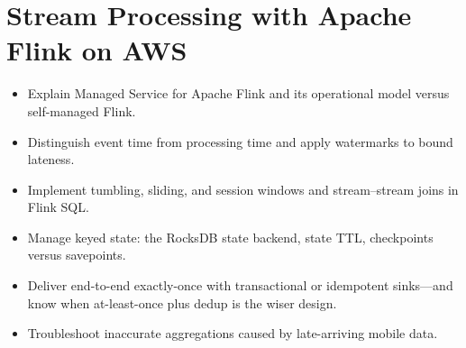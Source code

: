 \chapter{Stream Processing with Apache Flink on AWS}
%
\begin{objectives}
\begin{itemize}
    \item Explain Managed Service for Apache Flink and its operational model versus self-managed Flink.
    \item Distinguish event time from processing time and apply watermarks to bound lateness.
    \item Implement tumbling, sliding, and session windows and stream--stream joins in Flink SQL.
    \item Manage keyed state: the RocksDB state backend, state TTL, checkpoints versus savepoints.
    \item Deliver end-to-end exactly-once with transactional or idempotent sinks---and know when at-least-once plus dedup is the wiser design.
    \item Troubleshoot inaccurate aggregations caused by late-arriving mobile data.
\end{itemize}
\end{objectives}

